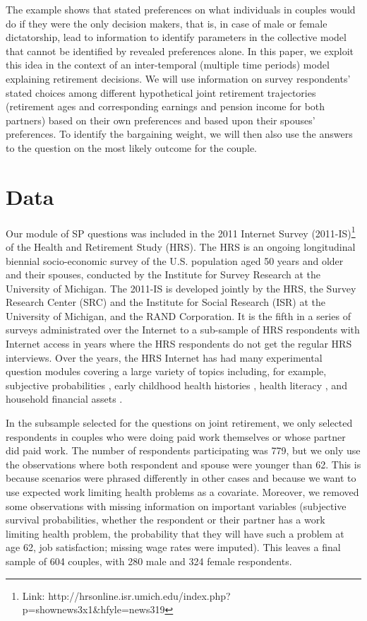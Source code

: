 \documentclass[11pt,letter]{article}
\begin{document}
The example shows that stated preferences on what individuals in couples would do if they were the only decision makers, that is, in case of male or female dictatorship, lead to information to identify parameters in the collective model that cannot be identified by revealed preferences alone. In this paper, we exploit this idea in the context of an inter-temporal (multiple time periods) model explaining retirement decisions. We will use information on survey respondents' stated choices among different hypothetical joint retirement trajectories (retirement ages and corresponding earnings and pension income for both partners) based on their own preferences and based upon their spouses' preferences. To identify the bargaining weight, we will then also use the answers to the question on the most likely outcome for the couple.

\section{Data}

\par   Our module of SP questions was included in the 2011 Internet Survey (2011-IS)\footnote {Link: http://hrsonline.isr.umich.edu/index.php?p=shownews3x1\&hfyle=news319} of the Health and Retirement Study (HRS). The HRS is an ongoing longitudinal biennial socio-economic survey of the U.S. population aged 50 years and older and their spouses, conducted by the Institute for Survey Research at the University of Michigan. The 2011-IS is developed jointly by the HRS, the Survey Research Center (SRC) and the Institute for Social Research (ISR) at the University of Michigan, and the RAND Corporation. It is the fifth in a series of surveys administrated over the Internet to a sub-sample of HRS respondents with Internet access in years where the HRS respondents do not get the regular HRS interviews. Over the years, the HRS Internet has had many experimental question modules covering a large variety of topics including, for example, subjective probabilities \citep{delavande2008}, early childhood health histories \citep{smith2011}, health literacy \citep{levy2015}, and household financial assets \citep{couper2013}.

In the subsample selected for the questions on joint retirement, we only selected respondents in couples who were doing paid work themselves or whose partner did paid work. The number of respondents participating was 779, but we only use the observations where both respondent and spouse were younger than 62. This is because scenarios were phrased differently in other cases and because we want to use expected work limiting health problems as a covariate. Moreover, we removed some observations with missing information on important variables (subjective survival probabilities, whether the respondent or their partner has a work limiting health problem, the probability that they will have such a problem at age 62, job satisfaction; missing wage rates were imputed). This leaves a final sample of 604 couples, with 280 male and 324 female respondents.
\end{document}
